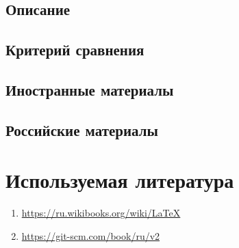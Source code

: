 \documentclass{article}
\begin{document}
	\subsection{Описание}
	\subsection{Критерий сравнения}
	\subsection{Иностранные материалы}
	\subsection{Российские материалы}
\newpage
\section{Используемая литература}
	\begin{enumerate}
		\item \href{https://ru.wikibooks.org/wiki/LaTeX}{https://ru.wikibooks.org/wiki/LaTeX}
		\item \href{https://git-scm.com/book/ru/v2}{https://git-scm.com/book/ru/v2}
		
	\end{enumerate}
\end{document}
